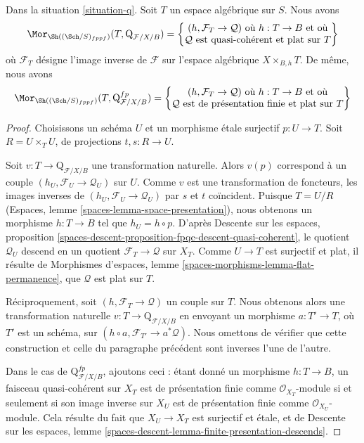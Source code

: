 \begin{lemma}
\label{lemma-extend-q-to-spaces}
Dans la situation \ref{situation-q}. Soit $T$ un espace algébrique sur $S$.
Nous avons
$$
\Mor_{\Sh((\Sch/S)_{fppf})}(T,  \text{Q}_{\mathcal{F}/X/B}) =
\left\{
\begin{matrix}
(h, \mathcal{F}_T \to \mathcal{Q}) \text{ où }
h : T \to B \text{ et où}\\
\mathcal{Q}\text{ est quasi-cohérent et plat sur }T
\end{matrix}
\right\}
$$
où $\mathcal{F}_T$ désigne l'image inverse de $\mathcal{F}$ sur l'espace
algébrique $X \times_{B, h} T$. De même, nous avons
$$
\Mor_{\Sh((\Sch/S)_{fppf})}(T,  \text{Q}^{fp}_{\mathcal{F}/X/B}) =
\left\{
\begin{matrix}
(h, \mathcal{F}_T \to \mathcal{Q}) \text{ où }
h : T \to B \text{ et où}\\
\mathcal{Q}\text{ est de présentation finie et plat sur }T
\end{matrix}
\right\}
$$
\end{lemma}

\begin{proof}
Choisissons un schéma $U$ et un morphisme \'etale surjectif $p : U \to T$.
Soit $R = U \times_T U$, de projections $t, s : R \to U$.

\medskip\noindent
Soit $v : T \to \text{Q}_{\mathcal{F}/X/B}$ une transformation naturelle.
Alors $v(p)$ correspond à un couple
$(h_U, \mathcal{F}_U \to \mathcal{Q}_U)$ sur $U$. Comme $v$ est une
transformation de foncteurs, les images inverses de
$(h_U, \mathcal{F}_U \to \mathcal{Q}_U)$ par $s$ et $t$ coïncident. Puisque
$T = U/R$ (Espaces, lemme \ref{spaces-lemma-space-presentation}), nous
obtenons un morphisme $h : T \to B$ tel que $h_U = h \circ p$. D'après
Descente sur les espaces, proposition
\ref{spaces-descent-proposition-fpqc-descent-quasi-coherent}, le quotient
$\mathcal{Q}_U$ descend en un quotient $\mathcal{F}_T \to \mathcal{Q}$ sur
$X_T$. Comme $U \to T$ est surjectif et plat, il résulte de Morphismes
d'espaces, lemme \ref{spaces-morphisms-lemma-flat-permanence}, que
$\mathcal{Q}$ est plat sur $T$.

\medskip\noindent
Réciproquement, soit $(h, \mathcal{F}_T \to \mathcal{Q})$ un couple sur $T$.
Nous obtenons alors une transformation naturelle
$v : T \to \text{Q}_{\mathcal{F}/X/B}$ en envoyant un morphisme
$a : T' \to T$, où $T'$ est un schéma, sur
$(h \circ a, \mathcal{F}_{T'} \to a^*\mathcal{Q})$. Nous omettons de vérifier
que cette construction et celle du paragraphe précédent sont inverses l'une
de l'autre.

\medskip\noindent
Dans le cas de $\text{Q}^{fp}_{\mathcal{F}/X/B}$, ajoutons ceci : étant donné
un morphisme $h : T \to B$, un faisceau quasi-cohérent sur $X_T$ est de
présentation finie comme $\mathcal{O}_{X_T}$-module si et seulement si son
image inverse sur $X_U$ est de présentation finie comme
$\mathcal{O}_{X_U}$-module. Cela résulte du fait que $X_U \to X_T$ est
surjectif et \'etale, et de Descente sur les espaces, lemme
\ref{spaces-descent-lemma-finite-presentation-descends}.
\end{proof}

